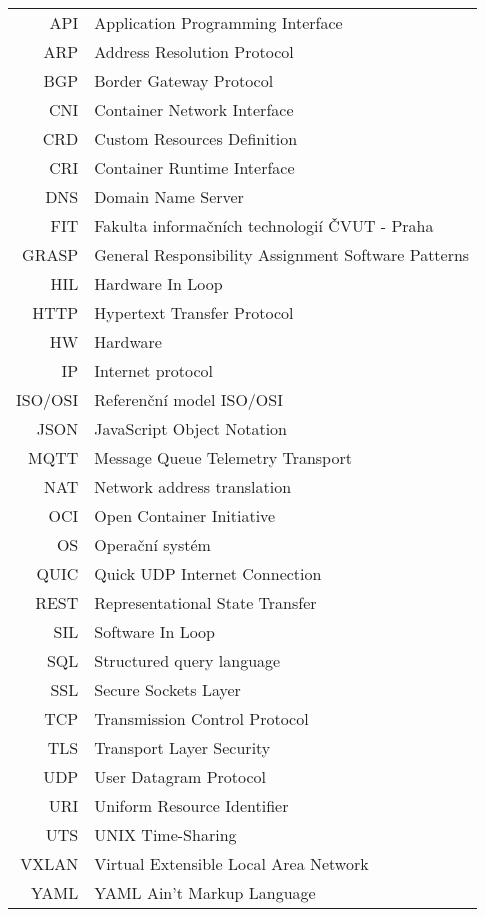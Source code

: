 


\begin{tabular}{rl}
API & Application Programming Interface\\
ARP & Address Resolution Protocol\\
BGP & Border Gateway Protocol\\
CNI & Container Network Interface\\
CRD & Custom Resources Definition\\
CRI & Container Runtime Interface\\
DNS & Domain Name Server\\
FIT & Fakulta informačních technologií ČVUT - Praha\\
GRASP & General Responsibility Assignment Software Patterns\\
HIL & Hardware In Loop\\
HTTP & Hypertext Transfer Protocol\\
HW & Hardware\\
IP & Internet protocol\\
ISO/OSI & Referenční model ISO/OSI\\
JSON & JavaScript Object Notation \\
MQTT & Message Queue Telemetry Transport\\
NAT & Network address translation\\
OCI & Open Container Initiative\\
OS & Operační systém\\
QUIC & Quick UDP Internet Connection\\
REST & Representational State Transfer\\
SIL & Software In Loop\\
SQL & Structured query language\\
SSL & Secure Sockets Layer\\
TCP & Transmission Control Protocol\\
TLS & Transport Layer Security\\
UDP & User Datagram Protocol\\
URI & Uniform Resource Identifier\\
UTS & UNIX Time-Sharing\\
VXLAN & Virtual Extensible Local Area Network\\
YAML & YAML Ain't Markup Language\\
\end{tabular}